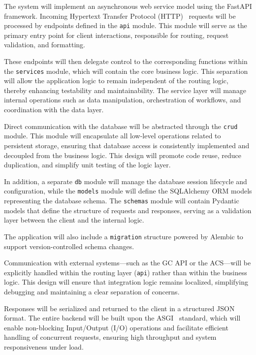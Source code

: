 The system will implement an asynchronous web service model using the FastAPI framework. Incoming Hypertext Transfer Protocol (HTTP)~\cite{HTTP} requests will be processed by endpoints defined in the \texttt{api} module. This module will serve as the primary entry point for client interactions, responsible for routing, request validation, and formatting.

\newpage

These endpoints will then delegate control to the corresponding functions within the \texttt{services} module, which will contain the core business logic. This separation will allow the application logic to remain independent of the routing logic, thereby enhancing testability and maintainability. The service layer will manage internal operations such as data manipulation, orchestration of workflows, and coordination with the data layer.

Direct communication with the database will be abstracted through the \texttt{crud} module. This module will encapsulate all low-level operations related to persistent storage, ensuring that database access is consistently implemented and decoupled from the business logic. This design will promote code reuse, reduce duplication, and simplify unit testing of the logic layer.

In addition, a separate \texttt{db} module will manage the database session lifecycle and configuration, while the \texttt{models} module will define the SQLAlchemy ORM models representing the database schema. The \texttt{schemas} module will contain Pydantic models that define the structure of requests and responses, serving as a validation layer between the client and the internal logic.

The application will also include a \texttt{migration} structure powered by Alembic to support version-controlled schema changes.

Communication with external systems—such as the GC API or the ACS—will be explicitly handled within the routing layer (\texttt{api}) rather than within the business logic. This design will ensure that integration logic remains localized, simplifying debugging and maintaining a clear separation of concerns.

Responses will be serialized and returned to the client in a structured JSON~\cite{JSON} format. The entire backend will be built upon the ASGI~\cite{ASGI} standard, which will enable non-blocking Input/Output (I/O) operations and facilitate efficient handling of concurrent requests, ensuring high throughput and system responsiveness under load.

